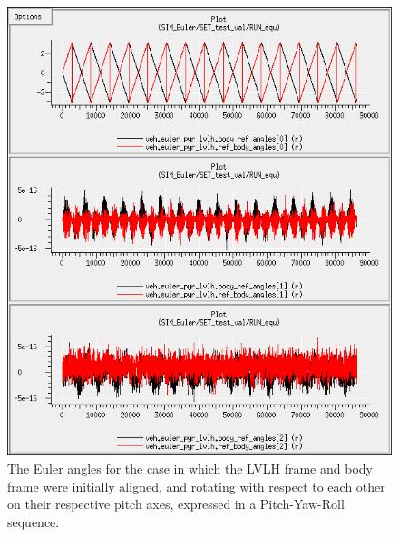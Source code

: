 \begin{description}
\begin{figure}[!ht]
\begin{center}
\includegraphics[width=5in]{figures/euler_aligned_pyr.jpg}
\caption{The Euler angles for the case in which the LVLH frame and body frame were initially aligned, and rotating with respect to each other on their respective pitch axes, expressed in a Pitch-Yaw-Roll sequence.}
\label{fig:euleralignedpyr}
\end{center}
\end{figure}


\end{description}
